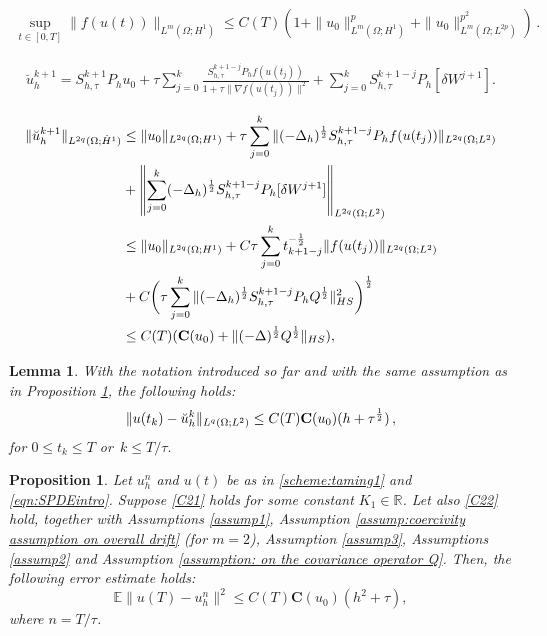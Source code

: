 \documentclass[10pt,a4paper]{amsart}
\newtheorem{proposition}{Proposition}
\newtheorem{lemma}{Lemma}
\newcommand{\R}{\mathbb{R}}
\newcommand{\con}{\mathbf{C}}
\begin{document}
\begin{align}\label{eq:fH1}
\sup\limits_{t\in[0,T]}\|f(u(t))\|_{L^{m}(\Omega;{H}^1)}\leq
C (T) (1+ \|u_0\|^p_{L^m(\Omega; {H}^1)}+ \|u_0\|^{p^2}_{L^m(\Omega; L^{2p})}) \,.
\end{align}

\begin{align}\label{aux}
\breve{u}_h^{k+1}=S_{h,\tau}^{k+1}P_hu_0+\tau\sum\limits_{j=0}^k \frac{S_{h,\tau}^{k+1-j}P_hf(u(t_j))}{1+\tau\|\nabla f(u(t_j))\|^2}+\sum\limits_{j=0}^k S_{h,\tau}^{k+1-j}P_h[\delta W^{j+1}].
\end{align}

\begin{align}\label{eq:hatu}
\|\breve{u}_h^{k+1}\|_{L^{2q}(\Omega;\dot{H}^1)}&\leq \|u_0\|_{L^{2q}(\Omega;H^1)}+\tau \sum\limits_{j=0}^k \|(-\Delta_h)^{\frac{1}{2}}S_{h,\tau}^{k+1-j}P_hf(u(t_j))\|_{L^{2q}(\Omega;L^2)}\notag\\
&+\left\|\sum\limits_{j=0}^k(-\Delta_h)^{\frac{1}{2}}S_{h,\tau}^{k+1-j}P_h[\delta W^{j+1}]\right\|_{L^{2q}(\Omega;L^2)} \notag\\
&\leq \|u_0\|_{L^{2q}(\Omega;H^1)}+C\tau\sum\limits_{j=0}^k t_{k+1-j}^{-\frac{1}{2}}\|f(u(t_j))\|_{L^{2q}(\Omega;L^2)}\notag\\
&+C\bigg(\tau\sum\limits_{j=0}^k \|(-\Delta_h)^{\frac{1}{2}}S_{h,\tau}^{k+1-j}P_hQ^{\frac{1}{2}}\|^2_{HS}\bigg)^{\frac{1}{2}}\notag\\
&\leq C(T) (\con(u_0) +\|(-\Delta)^{\frac{1}{2}}Q^{\frac{1}{2}}\|_{HS}), 
\end{align}

\begin{lemma}\label{lem:erruhat}
With the notation introduced so far and with the same assumption as in Proposition \ref{Prop: one time  step estimate taming1}, the following holds: 
\begin{align}
\|u(t_k)-\breve{u}_h^k\|_{L^q(\Omega;L^2)}
\leq C(T)\con(u_0)(h+\tau^{\frac{1}{2}}) \, ,\notag
\end{align}
for $0\leq t_k \leq T$
or\  $k\leq T/\tau$. 
\end{lemma}

\begin{proposition}\label{Prop: one time  step estimate taming1}
Let $u_h^n$ and $u(t)$ be as in \eqref{scheme:taming1} and \eqref{eqn:SPDEintro}.  Suppose  \eqref{C21} holds for some constant $K_1 \in \R$.  Let also \eqref{C22} hold, together with Assumptions \ref{assump1}, Assumption \ref{assump:coercivity assumption on overall drift} (for $m=2$), Assumption \ref{assump3}, Assumptions \ref{assump2} and Assumption \ref{assumption: on the covariance operator Q}. Then, the following error estimate holds:
\begin{equation}\label{eqn:finite time bound for our scheme}
\mathbb E \|u(T) -u_h^n \|^2 \leq C(T) \con(u_0)(h^2+\tau),
\end{equation}
  where $n=T/\tau$. 
\end{proposition}
\end{document}
